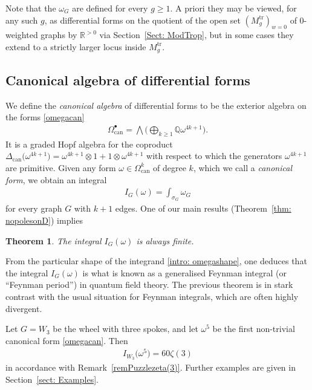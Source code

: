 \documentclass[pdftex]{sigma}%
\newtheorem{thm}{Theorem}[section]
\numberwithin{equation}{section}
\newcommand{\Q}{\mathbb Q}
\newcommand{\R}{\mathbb R}
\newcommand{\tr}{\mathrm{tr}}
\newcommand{\can}{\mathrm{can}}
\newcommand{\0}{\color{blue}{\mathsf{0}}}
\begin{document}
Note that the $\omega_G$ are defined for every $g\geq 1$. A priori they may be viewed, for any such $g$, as differential forms on the quotient of the open set $(M^{\tr}_g)_{w=0}$
 of $0$-weighted graphs by $\R^{>0}$ via Section~\ref{Sect: ModTrop}, but in some cases they extend to a strictly larger locus inside $M^{\tr}_g$.

\subsection{Canonical algebra of differential forms}
We define the \emph{canonical algebra} of differential forms to be the exterior algebra on the forms \eqref{omegacan}
\begin{gather*} %
\Omega^{\bullet}_{\can} = \bigwedge \bigg( \bigoplus_{k\geq 1} \Q \omega^{4k+1}\bigg) .
\end{gather*}
It is a graded Hopf algebra for the coproduct $\Delta_{\can}\big(\omega^{4k+1}\big) = \omega^{4k+1} \otimes 1 + 1 \otimes \omega^{4k+1}$ with respect to which the
 generators $\omega^{4k+1}$ are primitive.
 Given any form $\omega \in \Omega_{\can}^k$ of degree $k$, which we call a \emph{canonical form}, we obtain an integral
\begin{gather} \label{IGdefn} I_G(\omega) = \int_{\sigma_G} \omega_G \end{gather}
for every graph $G$ with $k+1$ edges. One of our main results (Theorem~\ref{thm: nopolesonD}) implies

\begin{thm} The integral $I_G(\omega)$ is always finite.
\end{thm}

From the particular shape of the integrand \eqref{intro: omegashape}, one deduces that the integral $I_G(\omega)$ is what is known as a generalised Feynman integral (or ``Feynman period'') in quantum field theory. The previous theorem is
 in stark contrast with the usual situation for Feynman integrals, which are often highly divergent.

\begin{Example} Let $G= W_3$ be the wheel with three spokes, and let $\omega^5$ be the first non-trivial canonical form \eqref{omegacan}. Then
\begin{gather*}
I_{W_3} \big(\omega^5 \big) = 60 \zeta(3)
\end{gather*}
in accordance with Remark~\ref{remPuzzlezeta(3)}. Further examples are given in Section~\ref{sect: Examples}.
\end{Example}
\end{document}
